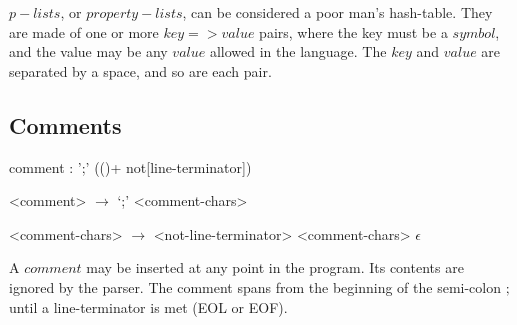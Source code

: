 \documentclass[a4paper]{article}
\begin{document}
$p-lists$, or $property-lists$, can be considered a poor man's hash-table. They are made of one or more $key => value$ pairs, where the key must be a $symbol$, and the value may be any $value$ allowed in the language. The $key$ and $value$ are separated by a space, and so are each pair.

\subsection{Comments}
\begin{rail}
	comment : ';' (()+ not[line-terminator])
\end{rail}

\begin{grammar}
	<comment> $\to$ `;' <comment-chars>
	
	<comment-chars> $\to$ <not-line-terminator> <comment-chars>
		\alt $\epsilon$
\end{grammar}

A $comment$ may be inserted at any point in the program. Its contents are ignored by the parser. The comment spans from the beginning of the semi-colon $;$ until a line-terminator is met (EOL or EOF).
\end{document}
